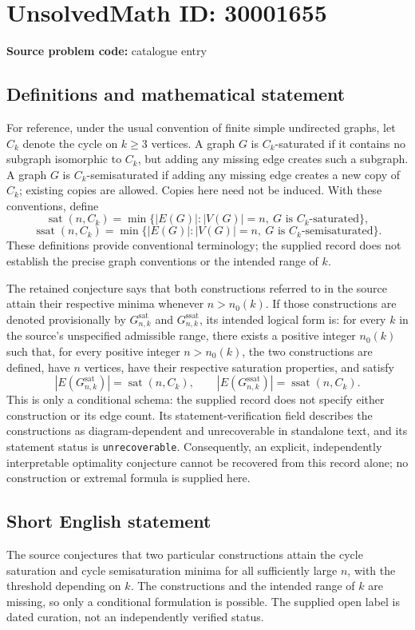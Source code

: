 \documentclass[11pt]{article}
\begin{document}
\section*{UnsolvedMath ID: 30001655}
\textbf{Source problem code:} catalogue entry
\subsection{Definitions and mathematical statement}
For reference, under the usual convention of finite simple undirected graphs, let \(C_k\) denote the cycle on \(k\geq 3\) vertices. A graph \(G\) is \(C_k\)-saturated if it contains no subgraph isomorphic to \(C_k\), but adding any missing edge creates such a subgraph. A graph \(G\) is \(C_k\)-semisaturated if adding any missing edge creates a new copy of \(C_k\); existing copies are allowed. Copies here need not be induced. With these conventions, define
\[
\operatorname{sat}(n,C_k)=\min\{|E(G)|:|V(G)|=n,\ G\text{ is }C_k\text{-saturated}\},
\]
\[
\operatorname{ssat}(n,C_k)=\min\{|E(G)|:|V(G)|=n,\ G\text{ is }C_k\text{-semisaturated}\}.
\]
These definitions provide conventional terminology; the supplied record does not establish the precise graph conventions or the intended range of \(k\).

The retained conjecture says that both constructions referred to in the source attain their respective minima whenever \(n>n_0(k)\). If those constructions are denoted provisionally by \(G^{\mathrm{sat}}_{n,k}\) and \(G^{\mathrm{ssat}}_{n,k}\), its intended logical form is: for every \(k\) in the source's unspecified admissible range, there exists a positive integer \(n_0(k)\) such that, for every positive integer \(n>n_0(k)\), the two constructions are defined, have \(n\) vertices, have their respective saturation properties, and satisfy
\[
|E(G^{\mathrm{sat}}_{n,k})|=\operatorname{sat}(n,C_k),\qquad
|E(G^{\mathrm{ssat}}_{n,k})|=\operatorname{ssat}(n,C_k).
\]
This is only a conditional schema: the supplied record does not specify either construction or its edge count. Its statement-verification field describes the constructions as diagram-dependent and unrecoverable in standalone text, and its statement status is \texttt{unrecoverable}. Consequently, an explicit, independently interpretable optimality conjecture cannot be recovered from this record alone; no construction or extremal formula is supplied here.
\subsection{Short English statement}
The source conjectures that two particular constructions attain the cycle saturation and cycle semisaturation minima for all sufficiently large \(n\), with the threshold depending on \(k\). The constructions and the intended range of \(k\) are missing, so only a conditional formulation is possible. The supplied open label is dated curation, not an independently verified status.
\end{document}
